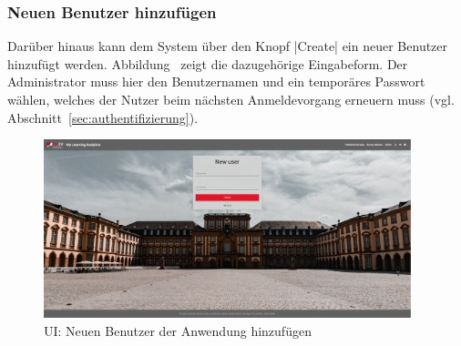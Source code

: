 \subsubsection*{Neuen Benutzer hinzufügen \faUsers}

Darüber hinaus kann dem System über den Knopf \jinline|Create| ein neuer Benutzer hinzufügt werden.
Abbildung~ zeigt die dazugehörige Eingabeform. 
Der Administrator muss hier den Benutzernamen und ein temporäres Passwort wählen, welches der Nutzer beim nächsten Anmeldevorgang erneuern muss (vgl. Abschnitt~\vref{sec:authentifizierung}). 

\begin{figure}[h]
	\centering
	\includegraphics[width=0.95\textwidth, keepaspectratio]{img/client/AdminCreateUser.png}
	\captionsetup{justification=centering, format=plain}
	\caption[\acl{UI}: Neuen Benutzer der Anwendung hinzufügen]{\acl{UI}: Neuen Benutzer der Anwendung hinzufügen \\ \quelleScreenshot}
	\label{fig:AdminCreateUserImplement}
\end{figure}
